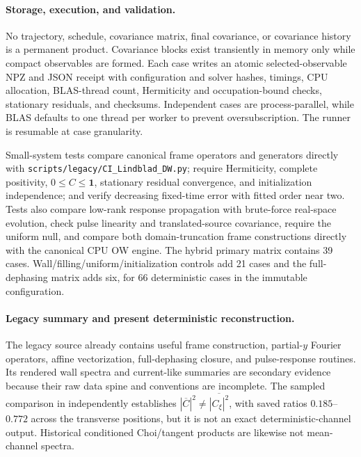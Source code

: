 \documentclass[aps,prx,twocolumn,floatfix,nofootinbib,superscriptaddress,longbibliography]{revtex4-2}
\newcommand{\code}[1]{\texttt{#1}}
\begin{document}
\paragraph*{Storage, execution, and validation.}
No trajectory, schedule, covariance matrix, final covariance, or covariance history is a
permanent product.  Covariance blocks exist transiently in memory only while compact
observables are formed.  Each case writes an atomic selected-observable NPZ and JSON
receipt with configuration and solver hashes, timings, CPU allocation, BLAS-thread count,
Hermiticity and occupation-bound checks, stationary residuals, and checksums.  Independent
cases are process-parallel, while BLAS defaults to one thread per worker to prevent
oversubscription.  The runner is resumable at case granularity.

Small-system tests compare canonical frame operators and generators directly with
\code{scripts/legacy/CI\_Lindblad\_DW.py}; require Hermiticity, complete positivity,
$0\leq C\leq\mathbf{1}$, stationary residual convergence, and initialization independence;
and verify decreasing fixed-time error with fitted order near two.  Tests also compare
low-rank response propagation with brute-force real-space evolution, check pulse
linearity and translated-source covariance, require the uniform null, and compare both
domain-truncation frame constructions directly with the canonical CPU OW engine.  The
hybrid primary matrix contains 39 cases.  Wall/filling/uniform/initialization controls add
21 cases and the full-dephasing matrix adds six, for 66 deterministic cases in the
immutable configuration.

\paragraph*{Legacy summary and present deterministic reconstruction.}
The legacy source already contains useful frame construction, partial-$y$ Fourier
operators, affine vectorization, full-dephasing closure, and pulse-response routines.  Its
rendered wall spectra and current-like summaries are secondary evidence because their raw
data spine and conventions are incomplete.  The sampled comparison in
 independently establishes
$|\overline C|^2\neq\overline{|C_\xi|^2}$, with saved ratios $0.185$--$0.772$ across the
transverse positions, but it is not an exact deterministic-channel output.  Historical
conditioned Choi/tangent products are likewise not mean-channel spectra.
\end{document}
